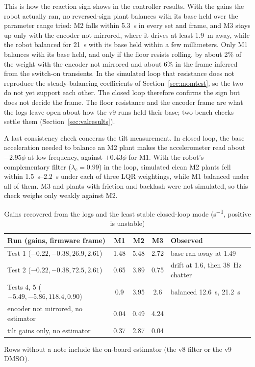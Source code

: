 This is how the reaction sign shows in the controller results. With the gains
the robot actually ran, no reversed-sign plant balances with its base held
over the parameter range tried: M2 falls within \SI{5.3}{s} in every set and
frame, and M3 stays up only with the encoder not mirrored, where it drives at
least \SI{1.9}{m} away, while the robot balanced for \SI{21}{s} with its base
held within a few millimeters. Only M1 balances with its base held, and only
if the floor resists rolling, by about 2\% of the weight with the encoder not
mirrored and about 6\% in the frame inferred from the switch-on transients. In
the simulated loop that resistance does not reproduce the steady-balancing
coefficients of Section~\ref{sec:momtest}, so the two do not yet support each
other. The closed loop therefore confirms the sign but does not decide the
frame. The floor resistance and the encoder frame are what the logs leave open
about how the v9 runs held their base; two bench checks settle them
(Section~\ref{sec:valresults}).

A last consistency check concerns the tilt measurement. In closed loop, the
base acceleration needed to balance an M2 plant makes the accelerometer read
about $-2.95\phi$ at low frequency, against $+0.43\phi$ for M1. With the
robot's complementary filter ($\lambda_c=0.99$) in the loop, simulated clean M2
plants fell within \SIrange{1.5}{2.2}{s} under each of three LQR weightings,
while M1 balanced under all of them. M3 and plants with friction and backlash
were not simulated, so this check weighs only weakly against M2.

\begin{table}[htbp]
\centering
\caption{Gains recovered from the logs and the least stable closed-loop mode
(\si{s^{-1}}, positive is unstable)}
\label{tab:gaintest}
\small
\begin{tabular}{lcccl}
\toprule
Run (gains, firmware frame) & M1 & M2 & M3 & Observed \\
\midrule
Test 1 ($-0.22,-0.38,26.9,2.61$) & 1.48 & 5.48 & 2.72 & base ran away at 1.49 \\
Test 2 ($-0.22,-0.38,72.5,2.61$) & 0.65 & 3.89 & 0.75 & drift at 1.6, then \SI{38}{Hz} chatter \\
Tests 4, 5 ($-5.49,-5.86,118.4,0.90$) & 0.9 & 3.95 & 2.6 & balanced \SI{12.6}{s}, \SI{21.2}{s} \\
\quad encoder not mirrored, no estimator & 0.04 & 0.49 & 4.24 & \\
\quad tilt gains only, no estimator & 0.37 & 2.87 & 0.04 & \\
\bottomrule
\end{tabular}

\smallskip
{\footnotesize Rows without a note include the on-board estimator (the v8
filter or the v9 DMSO).}
\end{table}

